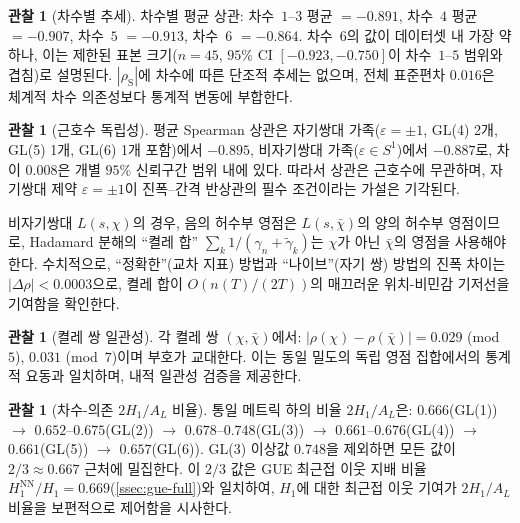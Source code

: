 \documentclass[11pt,a4paper]{article}
\theoremstyle{plain}
\theoremstyle{definition}
\newtheorem{observation}[theorem]{관찰}
\begin{document}
\begin{observation}[차수별 추세]\label{obs:degree_trend}
차수별 평균 상관: 차수~$1$--$3$ 평균 $= -0.891$, 차수~$4$ 평균 $= -0.907$,
차수~$5$ $= -0.913$, 차수~$6$ $= -0.864$.
차수~$6$의 값이 데이터셋 내 가장 약하나, 이는 제한된 표본 크기($n = 45$,
$95\%$ CI $[-0.923, -0.750]$이 차수~$1$--$5$ 범위와 겹침)로 설명된다.
$|\rho_{\mathrm{S}}|$에 차수에 따른 단조적 추세는 없으며,
전체 표준편차 $0.016$은 체계적 차수 의존성보다 통계적 변동에 부합한다.
\end{observation}

\begin{observation}[근호수 독립성]\label{obs:root_number}
평균 Spearman 상관은 자기쌍대 가족($\varepsilon = \pm 1$, GL(4) 2개, GL(5) 1개, GL(6) 1개 포함)에서 $-0.895$,
비자기쌍대 가족($\varepsilon \in S^1$)에서 $-0.887$로,
차이 $0.008$은 개별 $95\%$ 신뢰구간 범위 내에 있다.
따라서 상관은 근호수에 무관하며,
자기쌍대 제약 $\varepsilon = \pm 1$이 진폭--간격 반상관의
필수 조건이라는 가설은 기각된다.

\smallskip\noindent
비자기쌍대 $L(s,\chi)$의 경우, 음의 허수부 영점은
$L(s,\bar{\chi})$의 양의 허수부 영점이므로,
Hadamard 분해의 ``켤레 합'' $\sum_k 1/(\gamma_n + \tilde{\gamma}_k)$는
$\chi$가 아닌 $\bar{\chi}$의 영점을 사용해야 한다.
수치적으로, ``정확한''(교차 지표) 방법과 ``나이브''(자기 쌍) 방법의
진폭 차이는 $|\Delta\rho| < 0.0003$으로,
켤레 합이 $O(n(T)/(2T))$의 매끄러운 위치-비민감 기저선을 기여함을 확인한다.
\end{observation}

\begin{observation}[켤레 쌍 일관성]\label{obs:conjugate}
각 켤레 쌍 $(\chi, \bar{\chi})$에서:
$|\rho(\chi) - \rho(\bar{\chi})| = 0.029$ (mod~$5$),
$0.031$ (mod~$7$)이며 부호가 교대한다.
이는 동일 밀도의 독립 영점 집합에서의 통계적 요동과 일치하며,
내적 일관성 검증을 제공한다.
\end{observation}

\begin{observation}[차수-의존 $2H_1/A_L$ 비율]\label{obs:h1_ratio}
통일 메트릭 하의 비율 $2H_1/A_L$은:
$0.666$(GL(1)) $\to$ $0.652$--$0.675$(GL(2)) $\to$
$0.678$--$0.748$(GL(3)) $\to$
$0.661$--$0.676$(GL(4)) $\to$ $0.661$(GL(5)) $\to$ $0.657$(GL(6)).
GL(3) 이상값 $0.748$을 제외하면 모든 값이 $2/3 \approx 0.667$ 근처에
밀집한다. 이 $2/3$ 값은 GUE 최근접 이웃 지배 비율
$H_1^{\mathrm{NN}}/H_1 = 0.669$(\cref{ssec:gue-full})와 일치하여,
$H_1$에 대한 최근접 이웃 기여가 $2H_1/A_L$ 비율을 보편적으로 제어함을 시사한다.
\end{observation}
\end{document}
